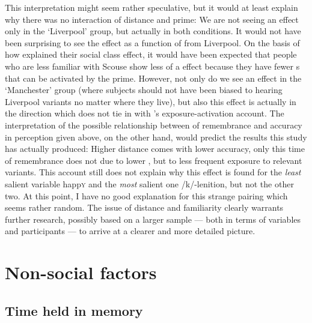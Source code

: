 This interpretation might seem rather speculative, but it would at least explain why there was no interaction of distance and prime: We are not seeing an effect only in the `Liverpool' group, but actually in both conditions.
It would not have been surprising to see the  effect  as a function of  from Liverpool.
On the basis of how \textcite{haydrager2010} explained their social class effect, it would have been expected that people who are less familiar with Scouse show less of a  effect because they have fewer s that can be activated by the prime.
However, not only do we see an effect in the `Manchester' group (where subjects should not have been biased to hearing Liverpool variants no matter where they live), but also this effect is actually in the direction which does not tie in with \citeauthor{haydrager2010}'s exposure-activation account.
The interpretation of the possible relationship between  of remembrance and accuracy in perception given above, on the other hand, would predict the results this study has actually produced: Higher distance comes with lower accuracy, only this time  of remembrance does not  due to lower , but to less frequent exposure to relevant variants.
This account still does not explain why this effect is found for the \emph{least} salient variable happ\textsc{y} and the \emph{most} salient one /k/-lenition, but not the other two.
At this point, I have no good explanation for this strange pairing which seems rather random.
The issue of distance and familiarity clearly warrants further research, possibly based on a larger sample --- both in terms of variables and participants --- to arrive at a clearer and more detailed picture.

	\section{Non-social factors}
		\label{sec.perc_res.disc.nonsocial}

		\subsection{Time held in memory}

